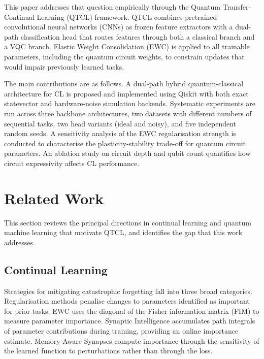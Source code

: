 \documentclass[acmlarge]{acmart}
\begin{document}
This paper addresses that question empirically through the Quantum Transfer-Continual Learning (QTCL) framework.
QTCL combines pretrained convolutional neural networks (CNNs) as frozen feature extractors with a dual-path classification head that routes features through both a classical branch and a VQC branch.
Elastic Weight Consolidation (EWC) \cite{Kirkpatrick2017} is applied to all trainable parameters, including the quantum circuit weights, to constrain updates that would impair previously learned tasks.

The main contributions are as follows.
A dual-path hybrid quantum-classical architecture for CL is proposed and implemented using Qiskit with both exact statevector and hardware-noise simulation backends.
Systematic experiments are run across three backbone architectures, two datasets with different numbers of sequential tasks, two head variants (ideal and noisy), and five independent random seeds.
A sensitivity analysis of the EWC regularisation strength is conducted to characterise the plasticity-stability trade-off for quantum circuit parameters.
An ablation study on circuit depth and qubit count quantifies how circuit expressivity affects CL performance.

\section{Related Work}

This section reviews the principal directions in continual learning and quantum machine learning that motivate QTCL, and identifies the gap that this work addresses.

\subsection{Continual Learning}

Strategies for mitigating catastrophic forgetting fall into three broad categories.
Regularisation methods penalise changes to parameters identified as important for prior tasks.
EWC \cite{Kirkpatrick2017} uses the diagonal of the Fisher information matrix (FIM) to measure parameter importance.
Synaptic Intelligence \cite{Zenke2017} accumulates path integrals of parameter contributions during training, providing an online importance estimate.
Memory Aware Synapses \cite{Aljundi2018} compute importance through the sensitivity of the learned function to perturbations rather than through the loss.
\end{document}
